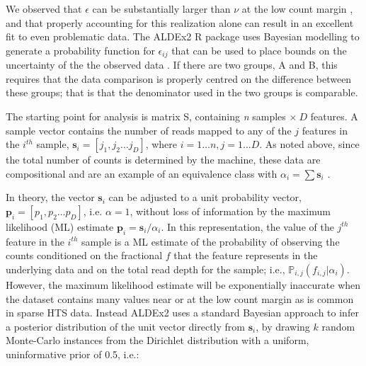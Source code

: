 \documentclass{bmcart}
\begin{document}
We  observed that $\epsilon$ can be substantially larger than $\nu$ at the low count margin \cite{fernandes:2013,gloorAJS:2016}, and that properly accounting for this realization alone can result in an excellent fit to even problematic data. 
The ALDEx2 R package  uses Bayesian modelling to generate a probability function for  $\epsilon_{ij}$ that can be used to place bounds on the uncertainty of the the observed data \cite{fernandes:2013,gloorAJS:2016}. If there are two groups, A and B,  this requires that the data comparison is properly centred on the difference between these groups; that is that the denominator used in the two groups is comparable.  




The starting point for analysis is matrix S, containing \textit{n} samples $ \times~D$ features. A  sample vector contains the number of reads mapped to any of the $j$  features in the $i^{th}$ sample,  $\textbf{s}_i=[j_1,j_2 \ldots j_D]$, where $i=1 \ldots n , j=1 \ldots D$. As noted above, since the total number of counts is determined by the machine, these data are compositional and are an example of an equivalence class with $\alpha_{i} = \sum \textbf{s}_{i}$ \cite{Gloor:2016cjm,gloor2016s}. 

In theory, the vector $\boldsymbol{s}_i$ can be adjusted to a unit probability vector,  ${\boldsymbol{p}_i=[p_1,p_2 \ldots p_D] }$, i.e. $\alpha=1$, without loss of information by the maximum likelihood (ML) estimate  $\boldsymbol{p}_i=\boldsymbol{s}_i / \alpha_{i}$. In this representation, the value of the $j^{th}$ feature in the $i^{th}$ sample is a ML estimate of the probability of observing the counts conditioned on the fractional  $f$ that the feature represents in the underlying data and on the total read depth for the sample; i.e., $\mathbb{P}_{i,j}(f_{i,j}|\alpha_{i})$. However, the maximum likelihood estimate will be exponentially inaccurate when the dataset contains many values near or at the low count margin \cite{Newey:1994} as is common in sparse HTS data. Instead ALDEx2 uses a standard Bayesian approach \cite{Jaynes:2003} to infer a posterior distribution of the unit vector directly from $\boldsymbol{s}_i$, by drawing $k$ random Monte-Carlo instances from the Dirichlet distribution with a uniform, uninformative prior of 0.5, i.e.:
\end{document}
